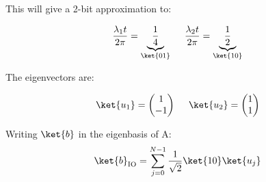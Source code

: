 This will give a 2-bit approximation to:

\begin{equation*}
    \frac{\lambda_1 t}{2 \pi} = \underbrace{\frac{1}{4}}_{\ket{01}} \ \ \ \ \frac{\lambda_2 t}{2 \pi} = \underbrace{\frac{1}{2}}_{\ket{10}}
\end{equation*}

The eigenvectors are: 

\begin{equation*}
    \ket{u_1} = \begin{pmatrix} 1 \\ -1 \end{pmatrix} \ \ \ \ \ket{u_2} = \begin{pmatrix} 1 \\ 1 \end{pmatrix}
\end{equation*}

Writing $\ket{b}$ in the eigenbasis of A:
\begin{equation*}
    \ket{b}_{\text{IO}} = \sum_{j=0}^{N-1} \frac{1}{\sqrt{2}} \ket{10} \ket{u_j}
\end{equation*}

